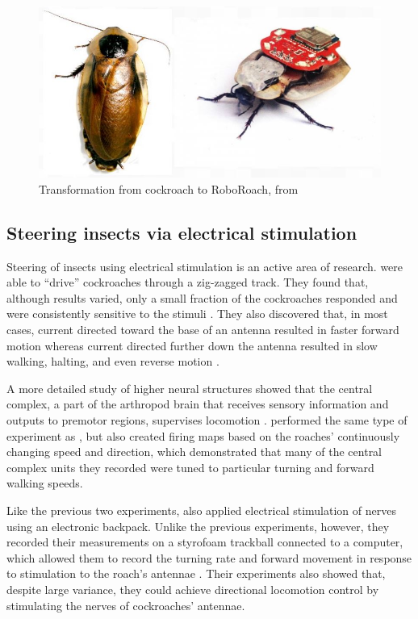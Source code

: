 \begin{figure}[ht!]
\centering
\includegraphics[scale=0.5]{Figures/motivation2.JPG}
\caption{Transformation from cockroach to RoboRoach, from \citep{backyardbrains2020roboroach}}
\label{fig:motivation2}
\end{figure}


\subsection{Steering insects via electrical stimulation}
Steering of insects using electrical stimulation is an active area of research. \citet{moore1998directed} were able to ``drive'' cockroaches through a zig-zagged track. They found that, although results varied, only a small fraction of the cockroaches responded and were consistently sensitive to the stimuli \citep{moore1998directed}. They also discovered that, in most cases, current directed toward the base of an antenna resulted in faster forward motion whereas current directed further down the antenna resulted in slow walking, halting, and even reverse motion \citep{moore1998directed}.

A more detailed study of higher neural structures showed that the central complex, a part of the arthropod brain that receives sensory information and outputs to premotor regions, supervises locomotion \citep{guo2013neural}. \citet{guo2013neural} performed the same type of experiment as \citet{moore1998directed}, but also created firing maps based on the roaches' continuously changing speed and direction, which demonstrated that many of the central complex units they recorded were tuned to particular turning and forward walking speeds.

Like the previous two experiments, \citet{holzer1997locomotion} also applied electrical stimulation of nerves using an electronic backpack. Unlike the previous experiments, however, they recorded their measurements on a styrofoam trackball connected to a computer, which allowed them to record the turning rate and forward movement in response to stimulation to the roach's antennae \citep{holzer1997locomotion}. Their experiments also showed that, despite large variance, they could achieve directional locomotion control by stimulating the nerves of cockroaches' antennae.

